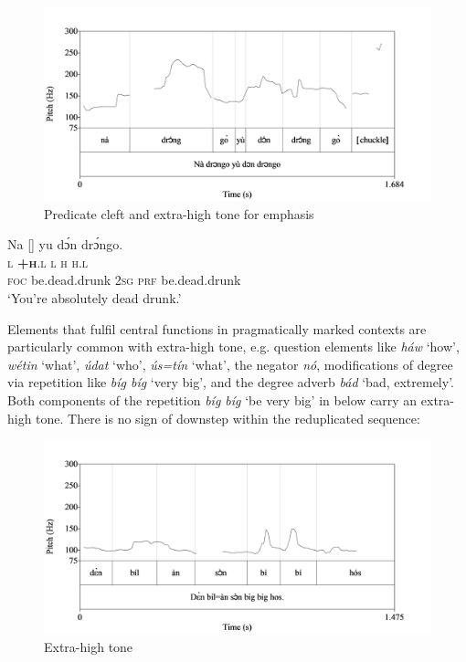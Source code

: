 \begin{figure}
\caption{Predicate cleft and extra-high tone for emphasis}
\label{fig:key:3.23}
\includegraphics[height=.3\textheight]{figures/yakpomod-img25.png}
\end{figure}
 


\ea%
    \label{ex:key:62}
    \glll   Na  []    yu  dɔ́n  drɔ́ngo. \\
\textsc{l}  \textbf{\textsc{+h}}\textsc{.l}        \textsc{l}  \textsc{h}  \textsc{h.l}\\
\textsc{foc}  be.dead.drunk  \textsc{2sg}  \textsc{prf}  be.dead.drunk\\
\glt ‘You’re absolutely dead drunk.’     
\z

Elements that fulfil central functions in pragmatically marked contexts are particularly common with extra-high tone, e.g. question elements like \textit{háw} ‘how’, \textit{wétin} ‘what’, \textit{údat} ‘who’, \textit{ús=tín}  ‘what’, the negator \textit{nó}, modifications of degree via repetition like \textit{bíg bíg} ‘very big’, and the degree adverb \textit{bád} ‘bad, extremely’. Both components of the repetition \textit{bíg bíg} ‘be very big’ in  below carry an extra-high tone. There is no sign of downstep within the reduplicated sequence: 

\begin{figure}
\caption{Extra-high tone}
\label{fig:key:3.24}
\includegraphics[height=.3\textheight]{figures/yakpomod-img26.png}
\end{figure}
 


